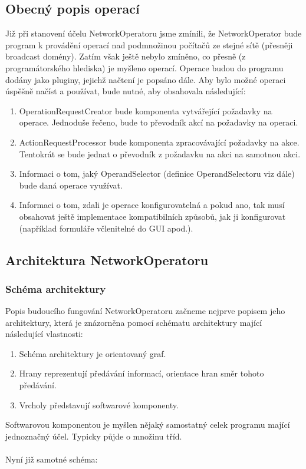 \documentclass[12pt]{article}
\begin{document}
\subsection{Obecný popis operací}
Již při stanovení účelu NetworkOperatoru jsme zmínili, že NetworkOperator bude program k provádění operací nad podmnožinou počítačů ze stejné sítě (přesněji broadcast domény). Zatím však ještě nebylo zmíněno, co přesně (z programátorského hlediska) je myšleno operací. Operace budou do programu dodány jako pluginy, jejichž načtení je popsáno dále. Aby bylo možné operaci úspěšně načíst a používat, bude nutné, aby obsahovala následující:
\begin{enumerate}[leftmargin=5mm]
\item OperationRequestCreator bude komponenta vytvářející požadavky na operace. Jednoduše řečeno, bude to převodník akcí na požadavky na operaci.
\item ActionRequestProcessor bude komponenta zpracovávající požadavky na akce. Tentokrát se bude jednat o převodník z požadavku na akci na samotnou akci.
\item Informaci o tom, jaký OperandSelector (definice OperandSelectoru viz dále) bude daná operace využívat.
\item Informaci o tom, zdali je operace konfigurovatelná a pokud ano, tak musí obsahovat ještě implementace kompatibilních způsobů, jak ji konfigurovat (například formuláře včlenitelné do GUI apod.).
\end{enumerate}

\subsection{Architektura NetworkOperatoru}
\subsubsection{Schéma architektury}
Popis budoucího fungování NetworkOperatoru začneme nejprve popisem jeho architektury, která je znázorněna pomocí schématu architektury mající následující vlastnosti:
\begin{enumerate}[leftmargin=5mm]
\item Schéma architektury je orientovaný graf.
\item Hrany reprezentují předávání informací, orientace hran směr tohoto předávání.
\item Vrcholy představují softwarové komponenty.
\end{enumerate}
Softwarovou komponentou je myšlen nějaký samostatný celek programu mající jednoznačný účel. Typicky půjde o množinu tříd.\\\\
Nyní již samotné schéma:
\end{document}
